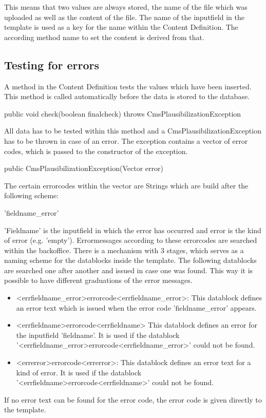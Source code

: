This means that two values are always stored, the name of the file which was
uploaded as well as the content of the file.
The name of the inputfield in the template is used as a key for the name within 
the Content Definition. The according method name to set the content is 
derived from that.

\subsection{Testing for errors}
A method in the Content Definition tests the values which have been inserted.
This method is called automatically before the data is stored to the database.

\begin{java}
public void check(boolean finalcheck) throws CmsPlausibilizationException
\end{java}

All data has to be tested within this method and a CmsPlausibilizationException
has to be thrown in case of an error. The exception contains a vector of 
error codes, which is passed to the constructor of the exception.

\begin{java}
public CmsPlausibilizationException(Vector error)
\end{java}

The certain errorcodes within the vector are Strings which are build 
after the following scheme:

'fieldname\_error'

'Fieldname' is the inputfield in which the error has occurred and error is
the kind of error (e.g. 'empty'). Errormessages according to these errorcodes
are searched within the backoffice. There is a mechanism with 3 stages, which
serves as a naming scheme for the datablocks inside the template. The following
datablocks are searched one after another and issued in case one was found.
This way it is possible to have different graduations of the error messages.

\begin{itemize}
\item <errfieldname\_error>errorcode<errfieldname\_error>: This datablock 
    defines an error text which is issued when the error code
    'fieldname\_error' appears.
\item <errfieldname>errorcode<errfieldname> This datablock defines
    an error for the inputfield 'fieldname'. It is used if the 
    datablock \\
    '<errfieldname\_error>errorcode<errfieldname\_error>' could
    not be found.
\item <errerror>errorcode<errerror>: This datablock defines an error text for
    a kind of error. It is used if the datablock 
    '<errfieldname>errorcode<errfieldname>' could not be found.
\end{itemize}

If no error text can be found for the error code, the error code is given 
directly to the template.




